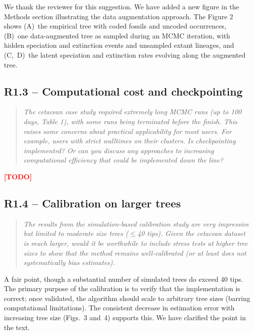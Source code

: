\documentclass[11pt]{article}
\newenvironment{RC}{\begin{quote}\itshape}{\end{quote}}
\newcommand{\response}[1]{\noindent\textcolor{resp}{#1}\medskip}
\newcommand{\todo}{\noindent\textcolor{red}{\textbf{[TODO]}}\medskip}
\begin{document}
\response{We thank the reviewer for this suggestion. We have added a new figure in the Methods section illustrating the data augmentation approach. The Figure 2 shows (A)~the empirical tree with coded fossils and uncoded occurrences, (B)~one data-augmented tree as sampled during an MCMC iteration, with hidden speciation and extinction events and unsampled extant lineages, and (C,~D)~the latent speciation and extinction rates evolving along the augmented tree.}

\subsection*{R1.3 -- Computational cost and checkpointing}

\begin{RC}
The cetacean case study required extremely long MCMC runs (up to 100 days, Table 1), with some runs being terminated before the finish. This raises some concerns about practical applicability for most users. For example, users with strict walltimes on their clusters. Is checkpointing implemented? Or can you discuss any approaches to increasing computational efficiency that could be implemented down the line?
\end{RC}

\todo

\subsection*{R1.4 -- Calibration on larger trees}

\begin{RC}
The results from the simulation-based calibration study are very impressive but limited to moderate size trees ($\leq$40 tips). Given the cetacean dataset is much larger, would it be worthwhile to include stress tests at higher tree sizes to show that the method remains well-calibrated (or at least does not systematically bias estimates).
\end{RC}

\response{A fair point, though a substantial number of simulated trees do exceed 40 tips. The primary purpose of the calibration is to verify that the implementation is correct; once validated, the algorithm should scale to arbitrary tree sizes (barring computational limitations). The consistent decrease in estimation error with increasing tree size (Figs.~3 and~4) supports this. We have clarified the point in the text.}
\end{document}
